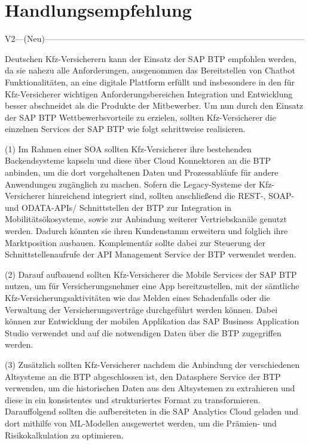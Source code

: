 \chapter{Handlungsempfehlung}


V2—(Neu)---------------------------------------------------------------------------------------------

Deutschen Kfz-Versicherern kann der Einsatz der SAP BTP empfohlen werden, da sie nahezu alle Anforderungen, ausgenommen das Bereitstellen von Chatbot Funktionalitäten, an eine digitale Plattform erfüllt und insbesondere in den für Kfz-Versicherer wichtigen Anforderungsbereichen Integration und Entwicklung besser abschneidet als die Produkte der Mitbewerber. Um nun durch den Einsatz der SAP BTP Wettbewerbsvorteile zu erzielen, sollten Kfz-Versicherer die einzelnen Services der SAP BTP wie folgt schrittweise realisieren. 

(1) Im Rahmen einer SOA sollten Kfz-Versicherer ihre bestehenden Backendsysteme kapseln und diese über Cloud Konnektoren an die BTP anbinden, um die dort vorgehaltenen Daten und Prozessabläufe für andere Anwendungen zugänglich zu machen. Sofern die Legacy-Systeme der Kfz-Versicherer hinreichend integriert sind, sollten anschließend die REST-, SOAP- und ODATA-APIs/ Schnittstellen der BTP zur Integration in Mobilitätsökosysteme, sowie zur Anbindung weiterer Vertriebskanäle genutzt werden. Dadurch könnten sie ihren Kundenstamm erweitern und folglich ihre Marktposition ausbauen. Komplementär sollte dabei zur Steuerung der Schnittstellenaufrufe der API Management Service der BTP verwendet werden.

(2) Darauf aufbauend sollten Kfz-Versicherer die Mobile Services der SAP BTP nutzen, um für Versicherungsnehmer eine App bereitzustellen, mit der sämtliche Kfz-Versicherungsaktivitäten wie das Melden eines Schadenfalls oder die Verwaltung der Versicherungsverträge durchgeführt werden können. Dabei können zur Entwicklung der mobilen Applikation das SAP Business Application Studio verwendet und auf die notwendigen Daten über die BTP zugegriffen werden. 

(3) Zusätzlich sollten Kfz-Versicherer nachdem die Anbindung der verschiedenen Altsysteme an die BTP abgeschlossen ist, den Datasphere Service der BTP verwenden, um die historischen Daten aus den Altsystemen zu extrahieren und diese in ein konsistentes und strukturiertes Format zu transformieren. Darauffolgend sollten die aufbereiteten in die SAP Analytics Cloud geladen und dort mithilfe von ML-Modellen ausgewertet werden, um die Prämien- und Risikokalkulation zu optimieren.

